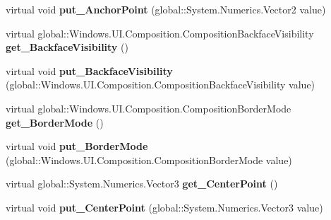 \begin{DoxyCompactItemize}
\mbox{\label{class_windows_1_1_u_i_1_1_composition_1_1_visual_aa1b0464e36040159979a9f686b078861}} 
virtual void {\bfseries put\+\_\+\+Anchor\+Point} (global\+::\+System.\+Numerics.\+Vector2 value)
\item 
\mbox{\label{class_windows_1_1_u_i_1_1_composition_1_1_visual_ab37e8a416eb15adcf52595af082a3080}} 
virtual global\+::\+Windows.\+U\+I.\+Composition.\+Composition\+Backface\+Visibility {\bfseries get\+\_\+\+Backface\+Visibility} ()
\item 
\mbox{\label{class_windows_1_1_u_i_1_1_composition_1_1_visual_a3b737ed77f1a9773db7d7bba9085d735}} 
virtual void {\bfseries put\+\_\+\+Backface\+Visibility} (global\+::\+Windows.\+U\+I.\+Composition.\+Composition\+Backface\+Visibility value)
\item 
\mbox{\label{class_windows_1_1_u_i_1_1_composition_1_1_visual_aadde0309db11b0ab71defebf5ac36226}} 
virtual global\+::\+Windows.\+U\+I.\+Composition.\+Composition\+Border\+Mode {\bfseries get\+\_\+\+Border\+Mode} ()
\item 
\mbox{\label{class_windows_1_1_u_i_1_1_composition_1_1_visual_ad4fd972123d9a322d431e5f8790ba7b9}} 
virtual void {\bfseries put\+\_\+\+Border\+Mode} (global\+::\+Windows.\+U\+I.\+Composition.\+Composition\+Border\+Mode value)
\item 
\mbox{\label{class_windows_1_1_u_i_1_1_composition_1_1_visual_a35059d715a23e7424f1d2560320e1cab}} 
virtual global\+::\+System.\+Numerics.\+Vector3 {\bfseries get\+\_\+\+Center\+Point} ()
\item 
\mbox{\label{class_windows_1_1_u_i_1_1_composition_1_1_visual_abaf21711735234faa45f4f4c7eee581d}} 
virtual void {\bfseries put\+\_\+\+Center\+Point} (global\+::\+System.\+Numerics.\+Vector3 value)
\item 
\mbox{\label{class_windows_1_1_u_i_1_1_composition_1_1_visual_ac3938fd79afc01b7c592141ee4b0cf63}} 

\end{DoxyCompactItemize}
